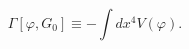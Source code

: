 \begin{equation}\label{veff}
    \Gamma[\varphi,G_{0}]\equiv -\int dx^{4} V(\varphi).
\end{equation}

